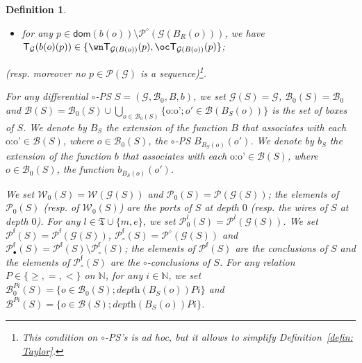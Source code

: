 \documentclass{article}
\theoremstyle{plain}
\newtheorem{definition}{Definition}
\newcommand{\Nat}{\ensuremath{\mathbb{N}}}
\newcommand{\groundof}[1]{\mathcal{G}(#1)}
\newcommand{\dom}[1]{\textsf{dom}(#1)}
\newcommand{\emptysequence}{\varepsilon}
\newcommand{\typesoflinks}{\mathfrak{T}}
\newcommand{\cod}{\oc}
\newcommand{\contr}{\wn}
\newcommand{\portsatzero}[1]{\mathcal{P}_0(#1)}
\newcommand{\wiresatzero}[1]{\mathcal{W}_0(#1)}
\newcommand{\ports}[1]{\mathcal{P}(#1)}
\newcommand{\conclusions}[1]{\mathcal{P}^{\textsf{f}}(#1)}
\newcommand{\portsoftype}[2]{\mathcal{P}^{#1}(#2)}
\newcommand{\portsatzerooftype}[2]{\mathcal{P}_0^{#1}(#2)}
\newcommand{\conclusionscirc}[1]{\mathcal{P}_\circ^{\textsf{f}}(#1)}
\newcommand{\conclusionsnotcirc}[1]{\mathcal{P}_\bullet^{\textsf{f}}(#1)}
\newcommand{\boxes}[1]{\mathcal{B}(#1)}
\newcommand{\boxesatzero}[1]{\mathcal{B}_{0}(#1)}
\newcommand{\wires}[1]{\mathcal{W}(#1)}
\begin{document}
\begin{definition}
\begin{itemize}
\begin{itemize}
\item for any $p \in \dom{b(o)} \setminus \portsoftype{\circ}{\groundof{B_R(o)}}$, we have $\textsf{T}_{\mathcal{G}}(b(o)(p)) \in \{  \contr \textsf{T}_{\groundof{B(o)}}(p), \cod \textsf{T}_{\groundof{B(o)}}(p) \}$;
\end{itemize}
\end{itemize}
(resp. moreover no $p \in \ports{\mathcal{G}}$ is a sequence)\footnote{This condition on $\circ$-PS's is \emph{ad hoc}, but it allows to simplify Definition~\ref{defin: Taylor}.}.
\begin{comment}
we require that
\begin{itemize}
\item $\emptysequence \notin \mathcal{B}_0$
\item and, for any $\mbox{o:o'} \in \mathcal{B}_0$ with $o' \not= \emptysequence$, we have $o \notin \mathcal{B}_0$.
\end{itemize}
\end{comment}
For any differential $\circ$-PS $S = (\mathcal{G}, \mathcal{B}_0, B, b)$, we set $\groundof{S} = \mathcal{G}$, $\boxesatzero{S} = \mathcal{B}_0$ and $\boxes{S} = \boxesatzero{S} \cup \bigcup_{o \in \boxesatzero{S}} \{ \mbox{o:o'} ; o' \in \boxes{B_S(o)} \}$ is the set of \emph{boxes of $S$}. We denote by $B_S$ the extension of the function $B$ that associates with each $\mbox{o:o'} \in \boxes{S}$, where $o \in \boxesatzero{S}$, the $\circ$-PS $B_{B_S(o)}(o')$. We denote by $b_S$ the extension of the function $b$ that associates with each $\mbox{o:o'} \in \boxes{S}$, where $o \in \boxesatzero{S}$, the function $b_{B_S(o)}(o')$.

We set 
$\wiresatzero{S} = \wires{\groundof{S}}$ and $\portsatzero{S} = \ports{\groundof{S}}$; the elements of $\portsatzero{S}$ (resp. of $\wiresatzero{S}$) are the \emph{ports of $S$ at depth $0$} (resp. the \emph{wires of $S$ at depth $0$}). 
For any $l \in \typesoflinks \cup \{ \textit{m}, \textit{e} \}$, we set $\portsatzerooftype{l}{S} = \portsoftype{l}{\groundof{S}}$. 
We set $\conclusions{S} = \conclusions{\groundof{S}}$, $\conclusionscirc{S} = \portsoftype{\circ}{\groundof{S}}$ and $\conclusionsnotcirc{S} = \conclusions{S} \setminus \conclusionscirc{S}$; the elements of $\conclusions{S}$ are the \emph{conclusions of $S$} and the elements of $\conclusionscirc{S}$ are the \emph{$\circ$-conclusions of $S$}. For any relation $P \in \{ \geq, =, < \}$ on $\Nat$, for any $i \in \Nat$, we set $\mathcal{B}_0^{P i}(S) = \{ o \in \boxesatzero{S} ; \textit{depth}(B_S(o)) P i \}$ and $\mathcal{B}^{P i}(S) = \{ o \in \boxes{S} ; \textit{depth}(B_S(o)) P i \}$.
\end{definition}
\end{document}
